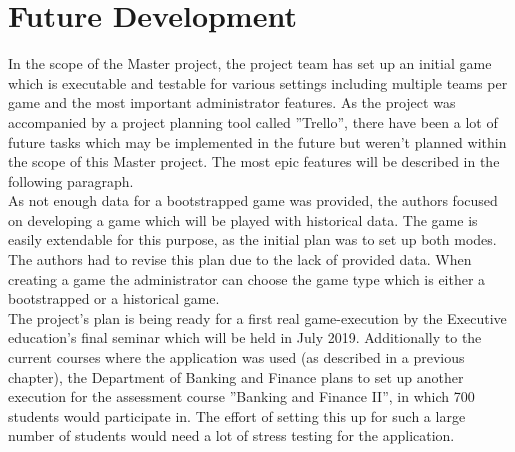 \section{Future Development}
In the scope of the Master project, the project team has set up an initial game which is executable and testable for various settings including multiple teams per game and the most important administrator features. As the project was accompanied by a project planning tool called ''Trello'', there have been a lot of future tasks which may be implemented in the future but weren't planned within the scope of this Master project. The most epic features will be described in the following paragraph. \\

As not enough data for a bootstrapped game was provided, the authors focused on developing a game which will be played with historical data. The game is easily extendable for this purpose, as the initial plan was to set up both modes. The authors had to revise this plan due to the lack of provided data. When creating a game the administrator can choose the game type which is either a bootstrapped or a historical game. \\


The project's plan is being ready for a first real game-execution by the Executive education's final seminar which will be held in July 2019. Additionally to the current courses where the application was used (as described in a previous chapter), the Department of Banking and Finance plans to set up another execution for the assessment course ''Banking and Finance II'', in which 700 students would participate in. The effort of setting this up for such a large number of students would need a lot of stress testing for the application.
